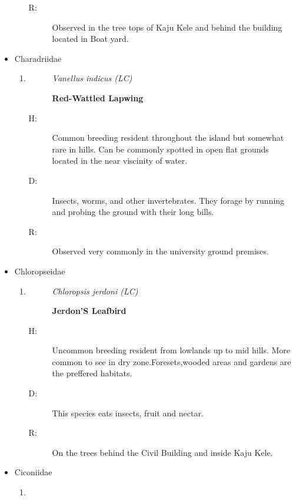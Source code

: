 \begin{itemize}
\begin{enumerate}
\begin{description}
\item[R: ]%
Observed in the tree tops of Kaju Kele and behind the building located in Boat yard.%
\end{description}%
\end{enumerate}%
\item%
Charadriidae%
\begin{enumerate}%
\item%
\begin{description}%
\item[]%
\textit{Vanellus indicus (LC)}%
\item[]%
\textbf{Red{-}Wattled Lapwing}%
\end{description}%
\begin{description}%
\item[H: ]%
Common breeding resident throughout the island but somewhat rare in hills. Can be commonly spotted in open flat grounds located in the near viscinity of water.%
\item[D: ]%
Insects, worms, and other invertebrates. They forage by running and probing the ground with their long bills.%
\item[R: ]%
Observed very commonly in the university ground premises.%
\end{description}%
\end{enumerate}%
\item%
Chloropseidae%
\begin{enumerate}%
\item%
\begin{description}%
\item[]%
\textit{Chloropsis jerdoni (LC)}%
\item[]%
\textbf{Jerdon'S Leafbird}%
\end{description}%
\begin{description}%
\item[H: ]%
Uncommon breeding resident from lowlands up to mid hills. More common to see in dry zone.Foresets,wooded areas and gardens are the preffered habitats.%
\item[D: ]%
This species eats insects, fruit and nectar. %
\item[R: ]%
On the trees behind the Civil Building and inside Kaju Kele.%
\end{description}%
\end{enumerate}%
\item%
Ciconiidae%
\begin{enumerate}%
\item%
\begin{description}%

\end{description}
\end{enumerate}
\end{itemize}
